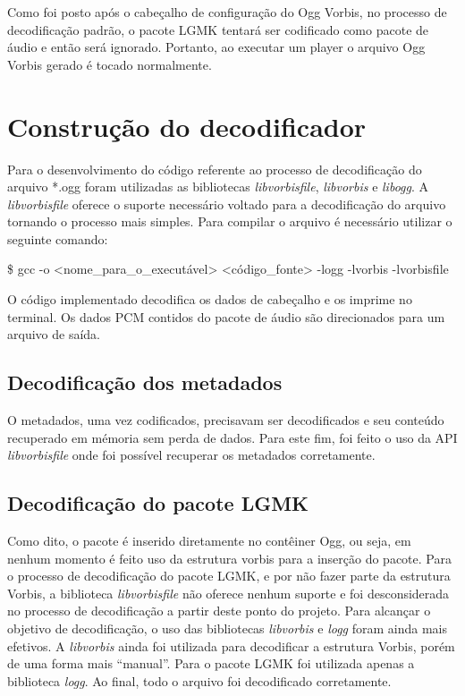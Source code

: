 Como foi posto após o cabeçalho de configuração do Ogg Vorbis, no processo de decodificação padrão, o pacote LGMK tentará ser codificado como pacote de áudio e então será ignorado. Portanto, ao executar um player o arquivo Ogg Vorbis gerado é tocado normalmente.

\section{Construção do decodificador}

Para o desenvolvimento do código referente ao processo de decodificação do arquivo *.ogg foram utilizadas as bibliotecas \textit{libvorbisfile}, \textit{libvorbis} e \textit{libogg}. A \textit{libvorbisfile} oferece o suporte necessário voltado para a decodificação do arquivo tornando o processo mais simples. Para compilar o arquivo é necessário utilizar o seguinte comando: 
	
   \$ gcc -o <nome\_para\_o\_executável> <código\_fonte> -logg -lvorbis -lvorbisfile

O código implementado decodifica os dados de cabeçalho e os imprime no terminal. Os dados PCM contidos do pacote de áudio são direcionados para um arquivo de saída.

\subsection{Decodificação dos metadados}

O metadados, uma vez codificados, precisavam ser decodificados e seu conteúdo recuperado em mémoria sem perda de dados. Para este fim, foi feito o uso da API \textit{libvorbisfile} onde foi possível recuperar os metadados corretamente.

\subsection{Decodificação do pacote LGMK}

Como dito, o pacote é inserido diretamente no contêiner Ogg, ou seja, em nenhum momento é feito uso da estrutura vorbis para a inserção do pacote. Para o processo de decodificação do pacote LGMK, e por não fazer parte da estrutura Vorbis, a biblioteca \textit{libvorbisfile} não oferece nenhum suporte e foi desconsiderada no processo de decodificação a partir deste ponto do projeto. Para alcançar o objetivo de decodificação, o uso das bibliotecas \textit{libvorbis} e \textit{logg} foram ainda mais efetivos. A \textit{libvorbis} ainda foi utilizada para decodificar a estrutura Vorbis, porém de uma forma mais ``manual''. Para o pacote LGMK foi utilizada apenas a biblioteca \textit{logg}. Ao final, todo o arquivo foi decodificado corretamente.